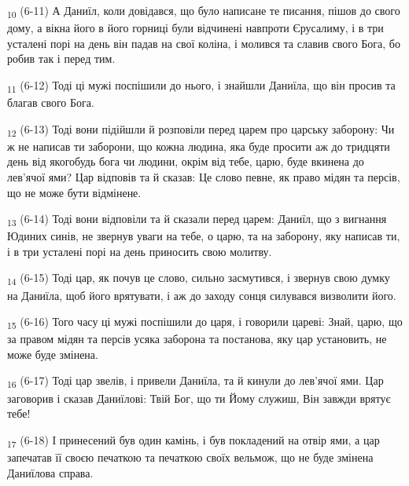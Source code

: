 \begin{tcolorbox}
\textsubscript{10} (6-11) А Даниїл, коли довідався, що було написане те писання, пішов до свого дому, а вікна його в його горниці були відчинені навпроти Єрусалиму, і в три усталені порі на день він падав на свої коліна, і молився та славив свого Бога, бо робив так і перед тим.
\end{tcolorbox}
\begin{tcolorbox}
\textsubscript{11} (6-12) Тоді ці мужі поспішили до нього, і знайшли Даниїла, що він просив та благав свого Бога.
\end{tcolorbox}
\begin{tcolorbox}
\textsubscript{12} (6-13) Тоді вони підійшли й розповіли перед царем про царську заборону: Чи ж не написав ти заборони, що кожна людина, яка буде просити аж до тридцяти день від якогобудь бога чи людини, окрім від тебе, царю, буде вкинена до лев'ячої ями? Цар відповів та й сказав: Це слово певне, як право мідян та персів, що не може бути відмінене.
\end{tcolorbox}
\begin{tcolorbox}
\textsubscript{13} (6-14) Тоді вони відповіли та й сказали перед царем: Даниїл, що з вигнання Юдиних синів, не звернув уваги на тебе, о царю, та на заборону, яку написав ти, і в три усталені порі на день приносить свою молитву.
\end{tcolorbox}
\begin{tcolorbox}
\textsubscript{14} (6-15) Тоді цар, як почув це слово, сильно засмутився, і звернув свою думку на Даниїла, щоб його врятувати, і аж до заходу сонця силувався визволити його.
\end{tcolorbox}
\begin{tcolorbox}
\textsubscript{15} (6-16) Того часу ці мужі поспішили до царя, і говорили цареві: Знай, царю, що за правом мідян та персів усяка заборона та постанова, яку цар установить, не може буде змінена.
\end{tcolorbox}
\begin{tcolorbox}
\textsubscript{16} (6-17) Тоді цар звелів, і привели Даниїла, та й кинули до лев'ячої ями. Цар заговорив і сказав Даниїлові: Твій Бог, що ти Йому служиш, Він завжди врятує тебе!
\end{tcolorbox}
\begin{tcolorbox}
\textsubscript{17} (6-18) І принесений був один камінь, і був покладений на отвір ями, а цар запечатав її своєю печаткою та печаткою своїх вельмож, що не буде змінена Даниїлова справа.
\end{tcolorbox}
